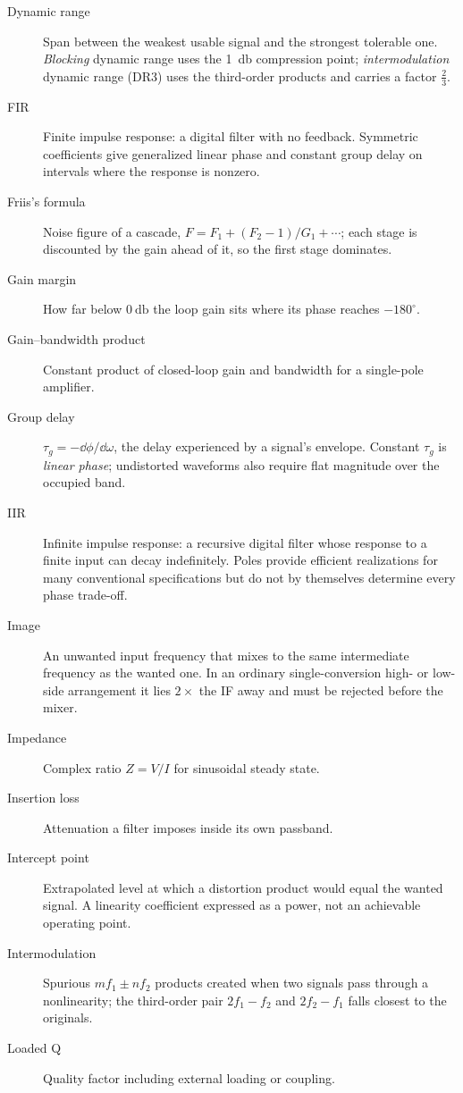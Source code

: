 \begin{description}
\item[Dynamic range] Span between the weakest usable signal and the strongest tolerable one. \emph{Blocking} dynamic range uses the \SI{1}{\decibel} compression point; \emph{intermodulation} dynamic range (DR3) uses the third-order products and carries a factor \(\tfrac23\).
\item[FIR] Finite impulse response: a digital filter with no feedback. Symmetric coefficients give generalized linear phase and constant group delay on intervals where the response is nonzero.
\item[Friis's formula] Noise figure of a cascade, \(F=F_1+(F_2-1)/G_1+\cdots\); each stage is discounted by the gain ahead of it, so the first stage dominates.
\item[Gain margin] How far below \(\SI{0}{\decibel}\) the loop gain sits where its phase reaches \(-180^\circ\).
\item[Gain--bandwidth product] Constant product of closed-loop gain and bandwidth for a single-pole amplifier.
\item[Group delay] \(\tau_g=-\dd\phi/\dd\omega\), the delay experienced by a signal's envelope. Constant \(\tau_g\) is \emph{linear phase}; undistorted waveforms also require flat magnitude over the occupied band.
\item[IIR] Infinite impulse response: a recursive digital filter whose response to a finite input can decay indefinitely. Poles provide efficient realizations for many conventional specifications but do not by themselves determine every phase trade-off.
\item[Image] An unwanted input frequency that mixes to the same intermediate frequency as the wanted one. In an ordinary single-conversion high- or low-side arrangement it lies \(2\times\) the IF away and must be rejected before the mixer.
\item[Impedance] Complex ratio \(Z=V/I\) for sinusoidal steady state.
\item[Insertion loss] Attenuation a filter imposes inside its own passband.
\item[Intercept point] Extrapolated level at which a distortion product would equal the wanted signal. A linearity coefficient expressed as a power, not an achievable operating point.
\item[Intermodulation] Spurious \(mf_1\pm nf_2\) products created when two signals pass through a nonlinearity; the third-order pair \(2f_1-f_2\) and \(2f_2-f_1\) falls closest to the originals.
\item[Loaded Q] Quality factor including external loading or coupling.

\end{description}
